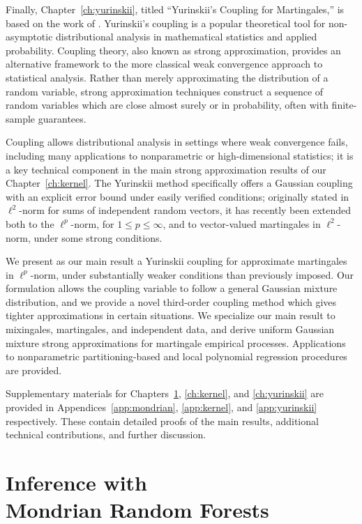 \documentclass[11pt,lof]{puthesis}
\theoremstyle{break}
\theoremstyle{proof}
\begin{document}
Finally, Chapter~\ref{ch:yurinskii}, titled ``Yurinskii's Coupling for
Martingales,'' is based on the work of \citet{cattaneo2022yurinskii}.
Yurinskii's coupling is a popular theoretical tool for non-asymptotic
distributional analysis in mathematical statistics and applied probability.
Coupling theory, also known as strong approximation, provides an alternative
framework to the more classical weak convergence approach to statistical
analysis. Rather than merely approximating the distribution of a random
variable, strong approximation techniques construct a sequence of random
variables which are close almost surely or in probability, often with
finite-sample guarantees.

Coupling allows distributional analysis in settings where weak convergence
fails, including many applications to nonparametric or high-dimensional
statistics; it is a key technical component in the main strong approximation
results of our Chapter~\ref{ch:kernel}. The Yurinskii method specifically
offers a Gaussian coupling with an explicit error bound under easily verified
conditions; originally stated in $\ell^2$-norm for sums of independent random
vectors, it has recently been extended both to the $\ell^p$-norm, for $1 \leq p
\leq \infty$, and to vector-valued martingales in $\ell^2$-norm, under some
strong conditions.

We present as our main result a Yurinskii coupling for approximate martingales
in $\ell^p$-norm, under substantially weaker conditions than previously
imposed. Our formulation allows the coupling variable to follow a
general Gaussian mixture distribution, and we provide a novel third-order
coupling method which gives tighter approximations in certain situations. We
specialize our main result to mixingales, martingales, and independent data,
and derive uniform Gaussian mixture strong approximations for martingale
empirical processes. Applications to nonparametric partitioning-based and local
polynomial regression procedures are provided.

Supplementary materials for Chapters~\ref{ch:mondrian}, \ref{ch:kernel}, and
\ref{ch:yurinskii} are provided in Appendices~\ref{app:mondrian},
\ref{app:kernel}, and \ref{app:yurinskii} respectively. These contain detailed
proofs of the main results, additional technical contributions, and further
discussion.

\chapter[Inference with Mondrian Random Forests]%
{Inference with \\ Mondrian Random Forests}
\label{ch:mondrian}
\end{document}
